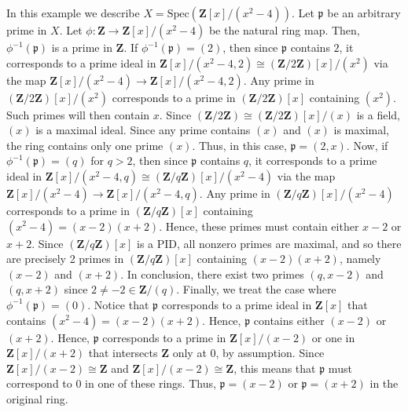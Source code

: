 \begin{example}
\label{example-spec-Zxmodx2minus4}
In this example we describe $X = \text{Spec} (\mathbf{Z}[x]/(x^2 - 4))$.
Let $\mathfrak{p}$ be an arbitrary prime in $X$.
Let $\phi: \mathbf{Z} \to \mathbf{Z}[x]/(x^2 - 4)$ be the natural ring map.
Then, $ \phi^{-1}(\mathfrak p)$ is a prime in $\mathbf{Z}$.
If $ \phi^{-1}(\mathfrak p) = (2)$, then since $\mathfrak p$ contains $2$,
it corresponds to a prime ideal in
$\mathbf{Z}[x]/(x^2 - 4, 2) \cong (\mathbf{Z}/2\mathbf{Z})[x]/(x^2)$
via the map $ \mathbf{Z}[x]/(x^2 - 4) \to  \mathbf{Z}[x]/(x^2 - 4, 2)$.
Any prime in $(\mathbf{Z}/2\mathbf{Z})[x]/(x^2)$ corresponds to a prime
in $(\mathbf{Z}/2\mathbf{Z})[x]$ containing $(x^2)$.  Such primes will
then contain $x$.  Since
$(\mathbf{Z}/2\mathbf{Z}) \cong (\mathbf{Z}/2\mathbf{Z})[x]/(x)$ is a field,
$(x)$ is a maximal ideal.  Since any prime contains $(x)$ and $(x)$ is
maximal, the ring contains only one prime $(x)$.  Thus, in this case,
$\mathfrak p = (2, x)$.  Now, if $ \phi^{-1}(\mathfrak p) = (q)$ for
$q > 2$, then since $\mathfrak p$ contains $q$, it corresponds to a
prime ideal in
$\mathbf{Z}[x]/(x^2 - 4, q) \cong (\mathbf{Z}/q\mathbf{Z})[x]/(x^2 - 4)$
via the map $ \mathbf{Z}[x]/(x^2 - 4) \to  \mathbf{Z}[x]/(x^2 - 4, q)$.
Any prime in $(\mathbf{Z}/q\mathbf{Z})[x]/(x^2 - 4)$ corresponds to a
prime in $(\mathbf{Z}/q\mathbf{Z})[x]$ containing $(x^2 - 4) = (x -2)(x+2)$.
Hence, these primes must contain either $x -2$ or $x+2$.  Since
$(\mathbf{Z}/q\mathbf{Z})[x]$ is a PID, all nonzero
primes are maximal, and so there
are precisely 2 primes in $(\mathbf{Z}/q\mathbf{Z})[x]$ containing
$(x-2)(x+2)$, namely $(x-2)$ and $(x+2)$.  In conclusion, there exist two
primes $(q, x-2)$ and $(q, x+2)$ since $2 \neq -2 \in \mathbf{Z}/(q)$.
Finally, we treat the case where $\phi^{-1}(\mathfrak p) = (0)$.  Notice
that $\mathfrak p$ corresponds to a prime ideal in $\mathbf{Z}[x]$ that
contains $(x^2 - 4) = (x -2)(x+2)$.  Hence, $\mathfrak p$ contains either
$(x-2)$ or $(x+2)$.  Hence, $\mathfrak p$ corresponds to a prime in
$\mathbf{Z}[x]/(x-2)$ or one in $\mathbf{Z}[x]/(x+2)$ that intersects
$\mathbf{Z}$ only at $0$, by assumption.  Since
$\mathbf{Z}[x]/(x-2) \cong \mathbf{Z}$ and
$\mathbf{Z}[x]/(x-2) \cong \mathbf{Z}$, this means that $\mathfrak p$
must correspond to $0$ in one of these rings.  Thus,
$\mathfrak p = (x-2)$ or $\mathfrak p = (x+2)$ in the original ring.
\end{example}

